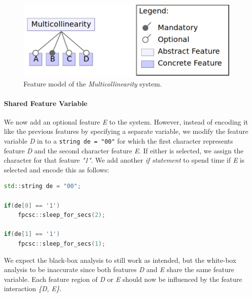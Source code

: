 \begin{figure}[H]
    \centering
    \includegraphics[scale=0.25]{gfx/Multicollinearity.png}
    \caption{Feature model of the \emph{Multicollinearity} system.}
    \label{fig:multicollinearity}
\end{figure}

\paragraph{Shared Feature Variable}\label{ground-truth:Shared}
We now add an optional feature \emph{E} to the system. 
However, instead of encoding it like the previous features by specifying a separate variable, 
we modify the feature variable \emph{D} in  to a \texttt{string de = "00"} 
for which the first character represents feature \emph{D} and the second character feature \emph{E}. If either is selected, 
we assign the character for that feature \emph{"1"}. We add another \emph{if statement} to spend time if \emph{E} is selected and encode this as follows:

\begin{minipage}{\linewidth}
\begin{lstlisting}[language=C++,label={lst:shared},escapechar=|]
std::string de = "00";

if(de[0] == '1')
    fpcsc::sleep_for_secs(2);

if(de[1] == '1')
    fpcsc::sleep_for_secs(1);
\end{lstlisting}
\end{minipage}

We expect the black-box analysis to still work as intended, but the white-box analysis to be inaccurate since both features \emph{D} and \emph{E} share the same feature variable. 
Each feature region of \emph{D} or \emph{E} should now be influenced by the feature interaction \emph{\{D, E\}}.